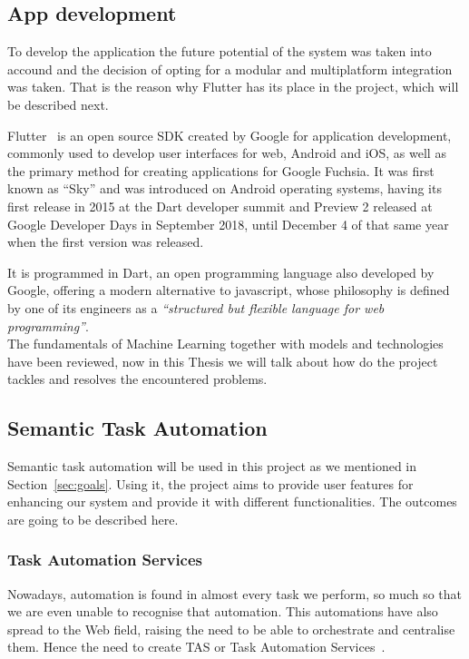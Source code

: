 \subsection{App development}
To develop the application the future potential of the system was taken into accound and the decision of opting for a modular and multiplatform integration was taken. That is the reason why Flutter has its place in the project, which will be described next.

Flutter~\cite{FlutterB22:online} is an open source SDK created by Google for application development, commonly used to develop user interfaces for web, Android and iOS, as well as the primary method for creating applications for Google Fuchsia. It was first known as ``Sky'' and was introduced on Android operating systems, having its first release in 2015 at the Dart developer summit and Preview 2 released at Google Developer Days in September 2018, until December 4 of that same year when the first version was released.

It is programmed in Dart, an open programming language also developed by Google, offering a modern alternative to javascript, whose philosophy is defined by one of its engineers as a \textit{``structured but flexible language for web programming''}.\\


The fundamentals of Machine Learning together with models and technologies have been reviewed, now in this Thesis we will talk about how do the project tackles and resolves the encountered problems. 

\subsection{Semantic Task Automation}

Semantic task automation will be used in this project as we mentioned in Section~\ref{sec:goals}. Using it, the project aims to provide user features for enhancing our system and provide it with different functionalities. The outcomes are going to be described here.

\subsubsection{Task Automation Services}
Nowadays, automation is found in almost every task we perform, so much so that we are even unable to recognise that automation. This automations have also spread to the Web field, raising the need to be able to orchestrate and centralise them. Hence the need to create TAS or Task Automation Services~\cite{7155422}.

